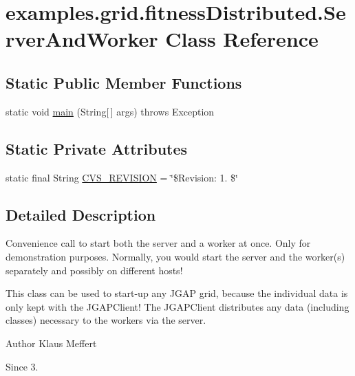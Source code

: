 \hypertarget{classexamples_1_1grid_1_1fitness_distributed_1_1_server_and_worker}{\section{examples.\-grid.\-fitness\-Distributed.\-Server\-And\-Worker Class Reference}
\label{classexamples_1_1grid_1_1fitness_distributed_1_1_server_and_worker}
}
\subsection*{Static Public Member Functions}
\begin{DoxyCompactItemize}
\item 
static void \hyperlink{classexamples_1_1grid_1_1fitness_distributed_1_1_server_and_worker_a74859e824133b1f020bc22cae56006ba}{main} (String\mbox{[}$\,$\mbox{]} args)  throws Exception 
\end{DoxyCompactItemize}
\subsection*{Static Private Attributes}
\begin{DoxyCompactItemize}
\item 
static final String \hyperlink{classexamples_1_1grid_1_1fitness_distributed_1_1_server_and_worker_a6499f85f982863449037552f2eb3b1a5}{C\-V\-S\-\_\-\-R\-E\-V\-I\-S\-I\-O\-N} = \char`\"{}\$Revision\-: 1. \$\char`\"{}
\end{DoxyCompactItemize}


\subsection{Detailed Description}
Convenience call to start both the server and a worker at once. Only for demonstration purposes. Normally, you would start the server and the worker(s) separately and possibly on different hosts!

This class can be used to start-\/up any J\-G\-A\-P grid, because the individual data is only kept with the J\-G\-A\-P\-Client! The J\-G\-A\-P\-Client distributes any data (including classes) necessary to the workers via the server.

\begin{DoxyAuthor}{Author}
Klaus Meffert 
\end{DoxyAuthor}
\begin{DoxySince}{Since}
3. 
\end{DoxySince}


